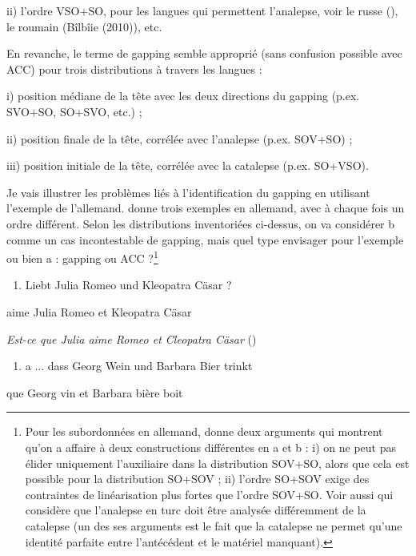 ii) l'ordre VSO+SO, pour les langues qui permettent l'analepse, voir le russe (\citet{Kazenin2001}), le roumain (Bîlbîie (2010)), etc. 

En revanche, le terme de gapping semble approprié (sans confusion possible avec ACC) pour trois distributions à travers les langues : 

i) position médiane de la tête avec les deux directions du gapping (p.ex. SVO+SO, SO+SVO, etc.) ; 

ii) position finale de la tête, corrélée avec l'analepse (p.ex. SOV+SO) ;

iii) position initiale de la tête, corrélée avec la catalepse (p.ex. SO+VSO).

Je vais illustrer les problèmes liés à l'identification du gapping en utilisant l'exemple de l'allemand. \citet{Haspelmath2007} donne trois exemples en allemand, avec à chaque fois un ordre différent. Selon les distributions inventoriées ci-dessus, on va considérer b comme un cas incontestable de gapping, mais quel type envisager pour l'exemple  ou bien a : gapping ou ACC ?\footnote{Pour les subordonnées en allemand, \citet{Maling1972} donne deux arguments qui montrent qu'on a affaire à deux constructions différentes en a et b : i) on ne peut pas élider uniquement l'auxiliaire dans la distribution SOV+SO, alors que cela est possible pour la distribution SO+SOV ; ii) l'ordre SO+SOV exige des contraintes de linéarisation plus fortes que l'ordre SOV+SO. Voir aussi \citet{Ince2009} qui considère que l'analepse en turc doit être analysée différemment de la catalepse (un des ses arguments est le fait que la catalepse ne permet qu'une identité parfaite entre l'antécédent et le matériel manquant).} 


\begin{enumerate}
\item \label{bkm:Ref287549104}Liebt Julia Romeo und Kleopatra Cäsar ?  


\end{enumerate}
  aime Julia Romeo et Kleopatra Cäsar

  \textit{Est-ce que Julia aime Romeo et Cleopatra Cäsar}      (\citet[44]{Haspelmath2007})


\begin{enumerate}
\item \label{bkm:Ref287549189}a  ... dass Georg Wein und Barbara Bier trinkt


\end{enumerate}
que Georg vin et Barbara bière boit


